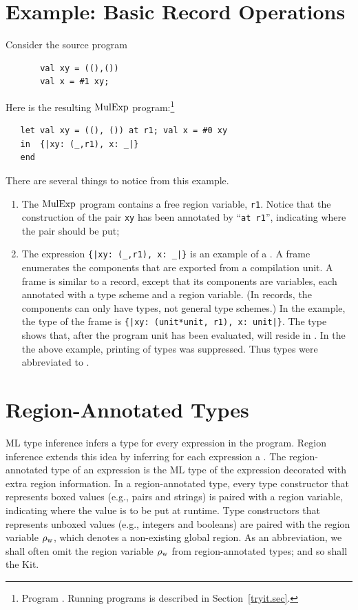 \documentclass[12pt]{book}
\newcommand{\rhoword}{\rho_{\rm w}}
\begin{document}
\section{Example: Basic Record Operations}
\label{proj.ex}
Consider the source program
\begin{verbatim}
       val xy = ((),()) 
       val x = #1 xy;
\end{verbatim}
Here is the resulting $\hbox{\rm MulExp}$ program:\footnote{Program
  . Running programs is described in
  Section~\ref{tryit.sec}.}
\begin{verbatim}
   let val xy = ((), ()) at r1; val x = #0 xy
   in  {|xy: (_,r1), x: _|}
   end 
\end{verbatim}
There are several things to notice from this example. 
\begin{enumerate}
\item The $\hbox{\rm MulExp}$ program contains a free region variable,
      {\tt r1}. Notice that the construction of the
      pair {\tt xy} has been annotated by ``{\tt at r1}'', indicating
      where the pair should be put;
\item The expression \verb+{|xy: (_,r1), x: _|}+ is
      an example of a . A frame enumerates
      the components that are exported from a compilation unit.
      A frame is similar to a record, except that its components
      are variables, each annotated with a type scheme and
      a region variable. (In records, the components can only
      have types, not general type schemes.) In the example,
      the type of the frame is \verb+{|xy: (unit*unit, r1), x: unit|}+. 
      The type shows that, after the program unit has been
      evaluated,   will reside in .
      In the the above example, printing of types was suppressed. Thus
      types were abbreviated to \boxml{\_}.
\end{enumerate}
\section{Region-Annotated Types}
\label{reganntypes.sec}
ML type inference infers a type for every expression in the program.
Region inference extends this idea by inferring for each expression a
. The
region-annotated type of an expression is the ML type of the
expression decorated with extra region information.  In a
region-annotated type, every type constructor that represents boxed
values (e.g., pairs and strings) is paired with a region variable,
indicating where the value is to be put at runtime. Type constructors
that represents unboxed values (e.g., integers and booleans) are
paired with the region variable $\rhoword$, which denotes a
non-existing global region.\index{$\rhoword$} As an
abbreviation, we shall often omit the region variable $\rhoword$ from
region-annotated types; and so shall the Kit.
\end{document}

